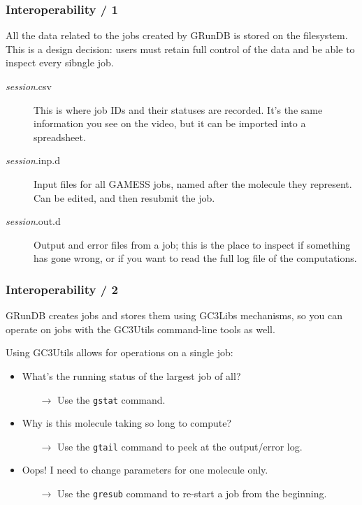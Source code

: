 \documentclass {beamer}
\newcommand{\largeskip}{\vspace{1em}}
\def\+{\largeskip}
\begin{document}
\begin{frame}[fragile]
  \frametitle{Interoperability / 1}

  All the data related to the jobs created by GRunDB is stored on the
  filesystem.  This is a design decision: users must retain full
  control of the data and be able to inspect every sibngle job.

  \+
  \begin{description}
  \item[{\em session}.csv]
    This is where job IDs and their statuses are recorded.  It's the
    same information you see on the video, but it can be imported into
    a spreadsheet.
  \item[{\em session}.inp.d]
    Input files for all GAMESS jobs, named after the molecule they
    represent.  Can be edited, and then resubmit the job.
  \item[{\em session}.out.d] 
    Output and error files from a job; this is the place to inspect if
    something has gone wrong, or if you want to read the full log file
    of the computations.
  \end{description}
\end{frame}

\begin{frame}[fragile]
  \frametitle{Interoperability / 2}
  
  GRunDB creates jobs and stores them using GC3Libs mechanisms, so you
  can operate on jobs with the GC3Utils command-line tools as well.

  \+ 
  Using GC3Utils allows for operations on a single job:
  \begin{itemize}
  \item What's the running status of the largest job of all? 
    \begin{itemize}\item[$\rightarrow$\space] 
      Use the \texttt{gstat} command.
    \end{itemize}
  \item Why is this molecule taking so long to compute?
    \begin{itemize}\item[$\rightarrow$\space] 
      Use the \texttt{gtail} command to peek at the output/error log.
    \end{itemize}
  \item Oops! I need to change parameters for one molecule only.
    \begin{itemize}\item[$\rightarrow$\space] 
      Use the \texttt{gresub} command to re-start a job from the
      beginning.
    \end{itemize}
  \end{itemize}
\end{frame}
\end{document}
